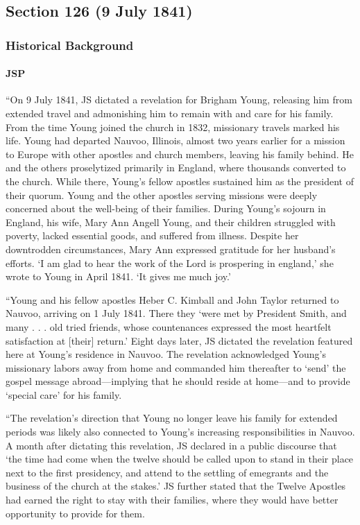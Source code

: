 \subsection{Section 126 (9 July 1841)}
	\label{DC126}
	
	\subsubsection{Historical Background}
		\label{DC126-HB}
		
		\paragraph{JSP}
		
			``On 9 July 1841, JS dictated a revelation for Brigham Young, releasing him from extended travel and admonishing him to remain with and care for his family. From the time Young joined the church in 1832, missionary travels marked his life. Young had departed Nauvoo, Illinois, almost two years earlier for a mission to Europe with other apostles and church members, leaving his family behind. He and the others proselytized primarily in England, where thousands converted to the church. While there, Young's fellow apostles sustained him as the president of their quorum. Young and the other apostles serving missions were deeply concerned about the well-being of their families. During Young's sojourn in England, his wife, Mary Ann Angell Young, and their children struggled with poverty, lacked essential goods, and suffered from illness. Despite her downtrodden circumstances, Mary Ann expressed gratitude for her husband's efforts. `I am glad to hear the work of the Lord is prospering in england,' she wrote to Young in April 1841. `It gives me much joy.'
			
			``Young and his fellow apostles Heber C. Kimball and John Taylor returned to Nauvoo, arriving on 1 July 1841. There they `were met by President Smith, and many . . . old tried friends, whose countenances expressed the most heartfelt satisfaction at [their] return.' Eight days later, JS dictated the revelation featured here at Young's residence in Nauvoo. The revelation acknowledged Young's missionary labors away from home and commanded him thereafter to `send' the gospel message abroad---implying that he should reside at home---and to provide `special care' for his family.
			
			``The revelation's direction that Young no longer leave his family for extended periods was likely also connected to Young's increasing responsibilities in Nauvoo. A month after dictating this revelation, JS declared in a public discourse that `the time had come when the twelve should be called upon to stand in their place next to the first presidency, and attend to the settling of emegrants and the business of the church at the stakes.' JS further stated that the Twelve Apostles had earned the right to stay with their families, where they would have better opportunity to provide for them.
			
